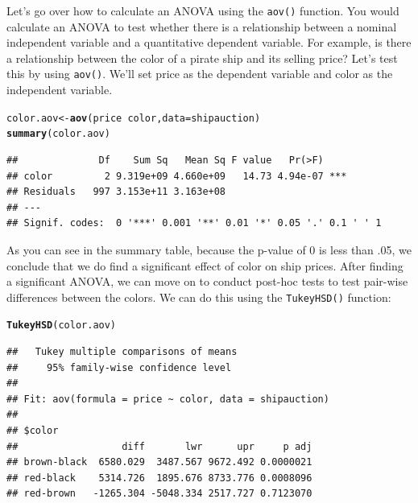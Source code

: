 \documentclass{tufte-book}\usepackage[]{graphicx}\usepackage[]{color}
\makeatletter
\newcommand{\hlopt}[1]{\textcolor[rgb]{0,0,0}{#1}}%
\newcommand{\hlstd}[1]{\textcolor[rgb]{0.345,0.345,0.345}{#1}}%
\newcommand{\hlkwb}[1]{\textcolor[rgb]{0.69,0.353,0.396}{#1}}%
\newcommand{\hlkwc}[1]{\textcolor[rgb]{0.333,0.667,0.333}{#1}}%
\newcommand{\hlkwd}[1]{\textcolor[rgb]{0.737,0.353,0.396}{\textbf{#1}}}%
\newenvironment{kframe}{%
 \def\at@end@of@kframe{}%
 \ifinner\ifhmode%
  \def\at@end@of@kframe{\end{minipage}}%
  \begin{minipage}{\columnwidth}%
 \fi\fi%
 \def\FrameCommand##1{\hskip\@totalleftmargin \hskip-\fboxsep
 \colorbox{shadecolor}{##1}\hskip-\fboxsep
     \hskip-\linewidth \hskip-\@totalleftmargin \hskip\columnwidth}%
 \MakeFramed {\advance\hsize-\width
   \@totalleftmargin\z@ \linewidth\hsize
   \@setminipage}}%
 {\par\unskip\endMakeFramed%
 \at@end@of@kframe}
\newenvironment{knitrout}{}{} %
\makeatother
\begin{document}
Let's go over how to calculate an ANOVA using the \texttt{aov()} function. You would calculate an ANOVA to test whether there is a relationship between a nominal independent variable and a quantitative dependent variable. For example, is there a relationship between the color of a pirate ship and its selling price? Let's test this by using \texttt{aov()}. We'll set price as the dependent variable and color as the independent variable.

\begin{knitrout}
\color{fgcolor}\begin{kframe}
\begin{alltt}
\hlstd{color.aov} \hlkwb{<-} \hlkwd{aov}\hlstd{(price} \hlopt{~} \hlstd{color,} \hlkwc{data} \hlstd{= shipauction)}
\hlkwd{summary}\hlstd{(color.aov)}
\end{alltt}
\begin{verbatim}
##              Df    Sum Sq   Mean Sq F value   Pr(>F)    
## color         2 9.319e+09 4.660e+09   14.73 4.94e-07 ***
## Residuals   997 3.153e+11 3.163e+08                     
## ---
## Signif. codes:  0 '***' 0.001 '**' 0.01 '*' 0.05 '.' 0.1 ' ' 1
\end{verbatim}
\end{kframe}
\end{knitrout}

As you can see in the summary table, because the p-value of 0 is less than .05, we conclude that we do find a significant effect of color on ship prices. After finding a significant ANOVA, we can move on to conduct post-hoc tests to test pair-wise differences between the colors. We can do this using the \texttt{TukeyHSD()} function:

\begin{knitrout}
\color{fgcolor}\begin{kframe}
\begin{alltt}
\hlkwd{TukeyHSD}\hlstd{(color.aov)}
\end{alltt}
\begin{verbatim}
##   Tukey multiple comparisons of means
##     95% family-wise confidence level
## 
## Fit: aov(formula = price ~ color, data = shipauction)
## 
## $color
##                  diff       lwr      upr     p adj
## brown-black  6580.029  3487.567 9672.492 0.0000021
## red-black    5314.726  1895.676 8733.776 0.0008096
## red-brown   -1265.304 -5048.334 2517.727 0.7123070
\end{verbatim}
\end{kframe}
\end{knitrout}
\end{document}
